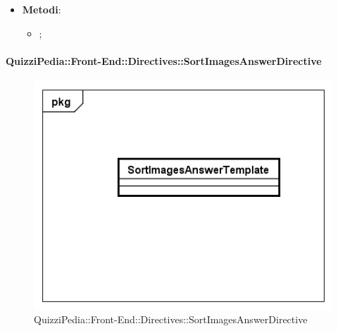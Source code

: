 \begin{itemize}
\begin{itemize}
			\end{itemize}
			 
			\item \textbf{Metodi}: 
			\begin{itemize}
				\item ;
			\end{itemize}
		\end{itemize}
		
		\paragraph{QuizziPedia::Front-End::Directives::SortImagesAnswerDirective}
		
		\label{QuizziPedia::Front-End::Directives::SortImagesAnswerDirective}
		
		\begin{figure}[ht]
			\centering
			\includegraphics[scale=0.80,keepaspectratio]{UML/Classi/Front-End/QuizziPedia_Front-end_Templates_SortImagesAnswerTemplate.png}
			\caption{QuizziPedia::Front-End::Directives::SortImagesAnswerDirective}
		\end{figure} \FloatBarrier
		
